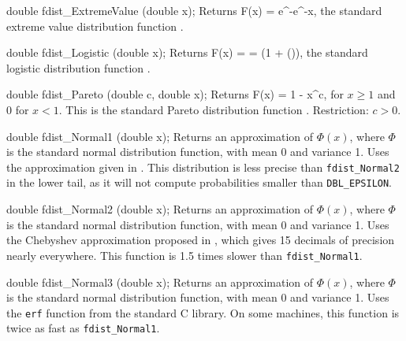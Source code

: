 double fdist_ExtremeValue (double x);
\endcode
 \tab
  Returns
 \eq
     F(x) = e^{-e^{-x}},                       
 \endeq
  the standard extreme value distribution function \cite{tJOH95b}.
 \endtab
\code


double fdist_Logistic (double x);
\endcode
 \tab
  Returns
  \eq F(x) =  =
       \left(1 + \tanh \left(\right)\right),
  \endeq
  the standard logistic distribution function \cite{tJOH95b}.
 \endtab
\code


double fdist_Pareto (double c, double x);
\endcode
  \tab
  Returns
  \eq
     F(x) = 1 -  {x^c},
  \endeq
  for $x\ge 1$ and 0 for $x<1$.  This is
  the standard Pareto distribution function \cite{tJOH95a}.
  Restriction: $c > 0$.
 \endtab
\code


double fdist_Normal1 (double x);
\endcode
  \tab
  Returns an approximation of $\Phi(x)$, where $\Phi$ is the standard normal
  distribution function, with mean 0 and variance 1.
  Uses the approximation given in \cite[page 90]{tKEN80a}. This distribution
  is less precise than {\tt fdist\_Normal2} in the lower tail, as it will
  not compute probabilities smaller than {\tt DBL\_EPSILON}.
 \endtab
\code


double fdist_Normal2 (double x);
\endcode
  \tab
  Returns an approximation of $\Phi(x)$,
  where $\Phi$ is the standard normal distribution function,
  with mean 0 and variance 1.
  Uses the Chebyshev approximation proposed in \cite{tSCH78a},
  which gives 15 decimals of precision nearly everywhere.
  This function is 1.5 times slower than {\tt fdist\_Normal1}.
 \endtab
\code


double fdist_Normal3 (double x);
\endcode
  \tab
  Returns an approximation of $\Phi(x)$,
  where $\Phi$ is the standard normal distribution function,
  with mean 0 and variance 1.
  Uses the {\tt erf} function from the standard C library. On some machines,
  this function is twice as fast as {\tt fdist\_Normal1}.
 \endtab
\code


